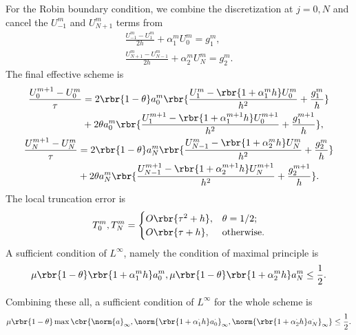 \documentclass[english, nochinese]{pnote}
\begin{document}
For the Robin boundary condition, we combine the discretization at $ j = 0, N $ and cancel the $U_{-1}^m$ and $ U_{ N + 1 }^m $ terms from
\begin{gather}
\label{Eq:Full1}
\frac{ U_{-1}^m - U_1^m }{ 2 h } + \alpha_1^m U_0^m = g_1^m, \\
\label{Eq:Full2}
\frac{ U_{ N + 1 }^m - U_{ N - 1 }^m }{ 2 h } + \alpha_2^m U_N^m = g_2^m.
\end{gather}
The final effective scheme is
\begin{gather}
\begin{split}
\frac{ U_0^{ m + 1 } - U_0^m }{\tau} &= 2 \rbr{ 1 - \theta } a_0^m \rbr{ \frac{ U_1^m - \rbr{ 1 + \alpha_1^m h } U_0^m }{h^2} + \frac{g_1^m}{h} } \\
&+ 2 \theta a_0^m \rbr{ \frac{ U_1^{ m + 1 } - \rbr{ 1 + \alpha_1^{ m + 1 } h } U_0^{ m + 1 } }{h^2} + \frac{g_1^{ m + 1 }}{h} },
\end{split}
\\
\begin{split}
\frac{ U_N^{ m + 1 } - U_N^m }{\tau} &= 2 \rbr{ 1 - \theta } a_N^m \rbr{ \frac{ U_{ N - 1 }^m - \rbr{ 1 + \alpha_2^m h } U_N^m }{h^2} + \frac{g_2^m}{h} } \\
&+ 2 \theta a_N^m \rbr{ \frac{ U_{ N - 1 }^{ m + 1 } - \rbr{ 1 + \alpha_2^{ m + 1 } h } U_N^{ m + 1 } }{h^2} + \frac{g_2^{ m + 1 }}{h} }.
\end{split}
\end{gather}
The local truncation error is
\begin{equation}
T_0^m, T_N^m =
\begin{cases}
O \rbr{ \tau^2 + h }, & \theta = 1 / 2; \\
O \rbr{ \tau + h }, & \text{otherwise}.
\end{cases}
\end{equation}
A sufficient condition of $L^{\infty}$, namely the condition of maximal principle is
\begin{equation}
\mu \rbr{ 1 - \theta } \rbr{ 1 + \alpha_1^m h } a_0^m, \mu \rbr{ 1 - \theta } \rbr{ 1 + \alpha_2^m h } a_N^m \le \frac{1}{2}.
\end{equation}

Combining these all, a sufficient condition of $L^{\infty}$ for the whole scheme is
\begin{equation}
\mu \rbr{ 1 - \theta } \max \cbr{ \norm{a}_{\infty}, \norm{ \rbr{ 1 + \alpha_1^{\cdot} h } a_0^{\cdot} }_{\infty}, \norm{ \rbr{ 1 + \alpha_2^{\cdot} h } a_N^{\cdot} }_{\infty} } \le \frac{1}{2}.
\end{equation}
\end{document}
